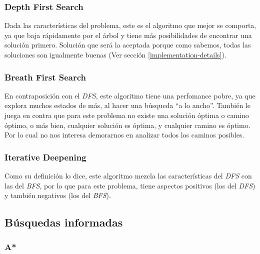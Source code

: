 \documentclass[a4paper,10pt]{article}
\begin{document}
    \subsubsection{Depth First Search}
    Dada las características del problema, este es el algoritmo que mejor se comporta, ya que baja rápidamente por el árbol y tiene más posibilidades de encontrar una solución primero.
    Solución que será la aceptada porque como sabemos, todas las soluciones son igualmente buenas (Ver sección \ref{implementation-details}).\\

    
    \subsubsection{Breath First Search}
    En contraposición con el \textit{DFS}, este algoritmo tiene una perfomance pobre, ya que explora muchos estados de más, al hacer una búsqueda ``a lo ancho''. También le juega en 
    contra que para este problema no existe una solución óptima o camino óptimo, o más bien, cualquier solución es óptima, y cualquier camino es óptimo. Por lo cual no nos interesa 
    demorarnos en analizar todos los caminos posibles.

    
    \subsubsection{Iterative Deepening}
    Como su definición lo dice, este algoritmo mezcla las características del \textit{DFS} con las del \textit{BFS}, por lo que para este problema, tiene aspectos positivos (los del 
    \textit{DFS}) y también negativos (los del \textit{BFS}). 

 
\subsection{Búsquedas informadas}
    
    \subsubsection{A*}
    
\end{document}
